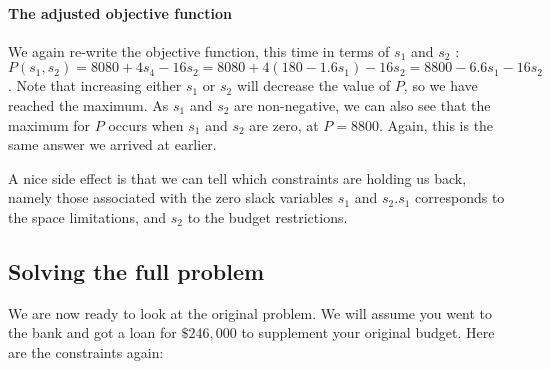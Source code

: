 \paragraph{The adjusted objective function}
We again re-write the objective function, this time in terms of $s_{1}$ and $s_{2}$ : $P\left(s_{1}, s_{2}\right)=8080+4 s_{4}-16 s_{2}=8080+4\left(180-1.6 s_{1}\right)-16 s_{2}=8800-6.6 s_{1}-16 s_{2}$. Note that increasing either $s_{1}$ or $s_{2}$ will decrease the value of $P$, so we have reached the maximum. As $s_{1}$ and $s_{2}$ are non-negative, we can also see that the maximum for $P$ occurs when $s_{1}$ and $s_{2}$ are zero, at $P=8800$. Again, this is the same answer we arrived at earlier.

A nice side effect is that we can tell which constraints are holding us back, namely those associated with the zero slack variables $s_{1}$ and $s_{2} . s_{1}$ corresponds to the space limitations, and $s_{2}$ to the budget restrictions.

\subsection*{Solving the full problem}
We are now ready to look at the original problem. We will assume you went to the bank and got a loan for $\$ 246,000$ to supplement your original budget. Here are the constraints again:

